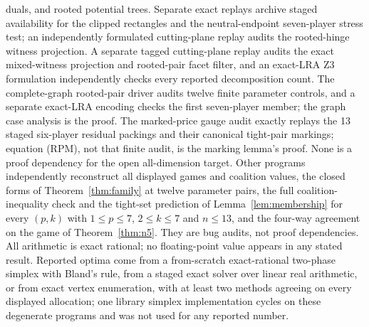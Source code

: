 \documentclass[11pt]{article}
\begin{document}
duals, and rooted potential trees.  Separate exact replays archive staged
availability for the clipped rectangles and the neutral-endpoint
seven-player stress test; an independently formulated cutting-plane replay
audits the rooted-hinge witness projection.  A separate tagged cutting-plane
replay audits the exact mixed-witness projection and rooted-pair facet filter,
and an exact-LRA Z3 formulation independently checks every reported
decomposition count.  The complete-graph rooted-pair driver audits twelve
finite parameter controls, and a separate exact-LRA encoding checks the first
seven-player member; the graph case analysis is the proof.  The marked-price
gauge audit exactly replays the 13 staged six-player residual packings and
their canonical tight-pair markings; equation (RPM), not that finite audit,
is the marking lemma's proof.  None is a proof
dependency for the open all-dimension target.  Other programs
independently reconstruct all displayed games and coalition values, the
closed forms of Theorem~\ref{thm:family} at twelve parameter pairs, the full
coalition-inequality check and the tight-set prediction of
Lemma~\ref{lem:membership} for every $(p,k)$ with $1\le p\le7$, $2\le k\le7$
and $n\le13$, and the four-way agreement on the game of
Theorem~\ref{thm:n5}.  They are bug audits, not proof dependencies.  All
arithmetic is exact rational; no floating-point value appears in any stated
result.  Reported optima come from a from-scratch exact-rational two-phase
simplex with Bland's rule, from a staged exact solver over linear real
arithmetic, or from exact vertex enumeration, with at least two methods
agreeing on every displayed allocation; one library simplex implementation
cycles on these degenerate programs and was not used for any reported number.
\end{document}
